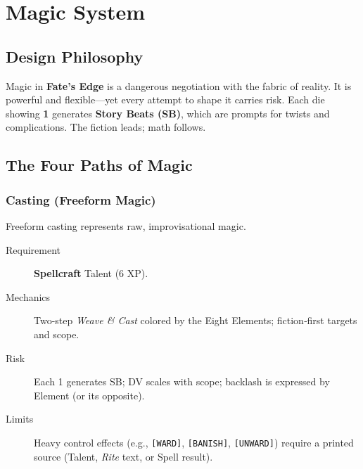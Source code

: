 
\chapter{Magic System}\label{chap:magic_system}

\section{Design Philosophy}\label{sec:magic_philosophy}

Magic in \textbf{Fate's Edge} is a dangerous negotiation with the fabric of reality. It is powerful and flexible---yet every attempt to shape it carries risk. Each die showing \textbf{1} generates \textbf{Story Beats (SB)}, which are prompts for twists and complications. The fiction leads; math follows.

\section{The Four Paths of Magic}\label{sec:four_paths}

\subsection{Casting (Freeform Magic)}\label{subsec:freeform_casting}

Freeform casting represents raw, improvisational magic.

\begin{description}
    \item[Requirement] \textbf{Spellcraft} Talent (6 XP).
    \item[Mechanics] Two-step \emph{Weave \& Cast} colored by the Eight Elements; fiction‑first targets and scope.
    \item[Risk] Each 1 generates SB; DV scales with scope; backlash is expressed by Element (or its opposite).
    \item[Limits] Heavy control effects (e.g., \texttt{[WARD]}, \texttt{[BANISH]}, \texttt{[UNWARD]}) require a printed source (Talent, \emph{Rite} text, or Spell result).
\end{description}

